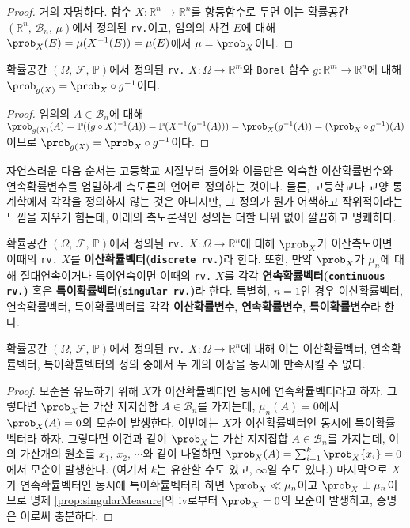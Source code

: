\begin{proof}
    거의 자명하다. 함수 $X:\mathbb{R}^n\to\mathbb{R}^n$를 항등함수로 두면 이는 확률공간 $(\mathbb{R}^n,\,\mathcal{B}_n,\,\mu)$에서 정의된 \texttt{rv.}이고, 임의의 사건 $E$에 대해 $\prob_X(E)=\mu(X^{-1}(E))=\mu(E)$에서 $\mu=\prob_X$이다.
\end{proof}

\begin{theorem}
    확률공간 $(\Omega,\,\mathcal{F},\,\mathbb{P})$에서 정의된 \texttt{rv.} $X:\Omega\to\mathbb{R}^m$와 \texttt{Borel} 함수 $g:\mathbb{R}^m\to\mathbb{R}^n$에 대해 $\prob_{g(X)}=\prob_X\circ g^{-1}$이다.
\end{theorem}

\begin{proof}
    임의의 $A\in\mathcal{B}_n$에 대해 $\prob_{g(X)}(A)=\mathbb{P}((g\circ X)^{-1}(A))=\mathbb{P}(X^{-1}(g^{-1}(A)))=\prob_X(g^{-1}(A))=(\prob_X\circ g^{-1})(A)$이므로 $\prob_{g(X)}=\prob_X\circ g^{-1}$이다.
\end{proof}

자연스러운 다음 순서는 고등학교 시절부터 들어와 이름만은 익숙한 이산확률변수와 연속확률변수를 엄밀하게 측도론의 언어로 정의하는 것이다. 물론, 고등학교나 교양 통계학에서 각각을 정의하지 않는 것은 아니지만, 그 정의가 뭔가 어색하고 작위적이라는 느낌을 지우기 힘든데, 아래의 측도론적인 정의는 더할 나위 없이 깔끔하고 명쾌하다.

\begin{definition}
    확률공간 $(\Omega,\,\mathcal{F},\,\mathbb{P})$에서 정의된 \texttt{rv.} $X:\Omega\to\mathbb{R}^n$에 대해 $\prob_X$가 이산측도이면 이때의 \texttt{rv.} $X$를 \textbf{이산확률벡터(\texttt{discrete rv.})}라 한다. 또한, 만약 $\prob_X$가 $\mu_n$에 대해 절대연속이거나 특이연속이면 이때의 \texttt{rv.} $X$를 각각 \textbf{연속확률벡터(\texttt{continuous rv.})} 혹은 \textbf{특이확률벡터(\texttt{singular rv.})}라 한다. 특별히, $n=1$인 경우 이산확률벡터, 연속확률벡터, 특이확률벡터를 각각 \textbf{이산확률변수}, \textbf{연속확률변수}, \textbf{특이확률변수}라 한다.
\end{definition}

\begin{proposition}
    확률공간 $(\Omega,\,\mathcal{F},\,\mathbb{P})$에서 정의된 \texttt{rv.} $X:\Omega\to\mathbb{R}^n$에 대해 이는 이산확률벡터, 연속확률벡터, 특이확률벡터의 정의 중에서 두 개의 이상을 동시에 만족시킬 수 없다.
\end{proposition}

\begin{proof}
    모순을 유도하기 위해 $X$가 이산확률벡터인 동시에 연속확률벡터라고 하자. 그렇다면 $\prob_X$는 가산 지지집합 $A\in\mathcal{B}_n$를 가지는데, $\mu_n(A)=0$에서 $\prob_X(A)=0$의 모순이 발생한다. 이번에는 $X$가 이산확률벡터인 동시에 특이확률벡터라 하자. 그렇다면 이건과 같이 $\prob_X$는 가산 지지집합 $A\in\mathcal{B}_n$를 가지는데, 이의 가산개의 원소를 $x_1,\,x_2,\,\cdots$와 같이 나열하면 $\prob_X(A)=\sum_{i=1}^k\prob_X\{x_i\}=0$에서 모순이 발생한다. (여기서 $k$는 유한할 수도 있고, $\infty$일 수도 있다.) 마지막으로 $X$가 연속확률벡터인 동시에 특이확률벡터라 하면 $\prob_X\ll\mu_n$이고 $\prob_X\perp\mu_n$이므로 명제 \ref{prop:singularMeasure}의 iv로부터 $\prob_X=0$의 모순이 발생하고, 증명은 이로써 충분하다.
\end{proof}

